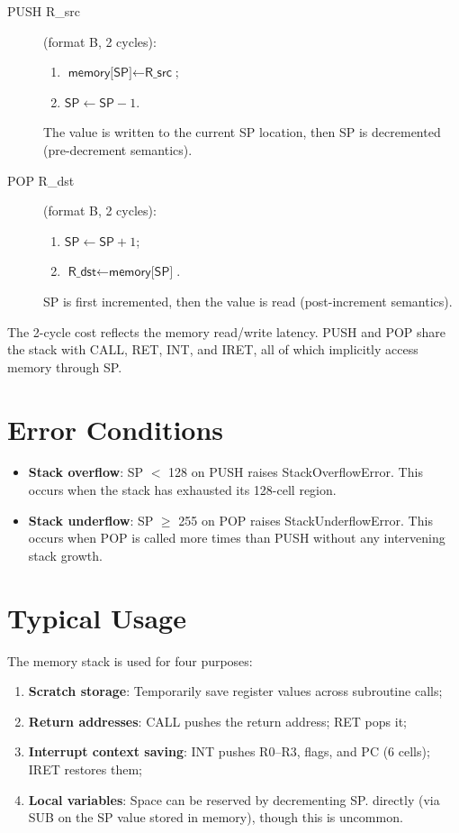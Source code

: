 \documentclass[12pt,a4paper,twoside]{book}
\theoremstyle{trinarytheorem}
\theoremstyle{trinarydefinition}
\newcommand{\code}[1]{\textsf{#1}}
\begin{document}
\begin{description}
    \item[\code{PUSH R\_src}] (format B, 2 cycles):
          \begin{enumerate}
              \item $\code{memory[SP]} \gets \code{R\_src}$;
              \item $\code{SP} \gets \code{SP} - 1$.
          \end{enumerate}
          The value is written to the current SP location, then SP is decremented
          (pre-decrement semantics).
    \item[\code{POP R\_dst}] (format B, 2 cycles):
          \begin{enumerate}
              \item $\code{SP} \gets \code{SP} + 1$;
              \item $\code{R\_dst} \gets \code{memory[SP]}$.
          \end{enumerate}
          SP is first incremented, then the value is read (post-increment semantics).
\end{description}

The 2-cycle cost reflects the memory read/write latency. PUSH and POP share the stack
with CALL, RET, INT, and IRET, all of which implicitly access memory through SP.

\section{Error Conditions}

\begin{itemize}
    \item \textbf{Stack overflow}: SP $<$ 128 on PUSH raises
          \code{StackOverflowError}. This occurs when the stack has exhausted its
          128-cell region.
    \item \textbf{Stack underflow}: SP $\ge$ 255 on POP raises
          \code{StackUnderflowError}. This occurs when POP is called more times
          than PUSH without any intervening stack growth.
\end{itemize}

\section{Typical Usage}

The memory stack is used for four purposes:
\begin{enumerate}
    \item \textbf{Scratch storage}: Temporarily save register values across
          subroutine calls;
    \item \textbf{Return addresses}: CALL pushes the return address; RET pops it;
    \item \textbf{Interrupt context saving}: INT pushes R0--R3, flags, and PC
          (6 cells); IRET restores them;
    \item \textbf{Local variables}: Space can be reserved by decrementing SP.
          directly (via SUB on the SP value stored in memory), though this is
          uncommon.
\end{enumerate}
\end{document}
